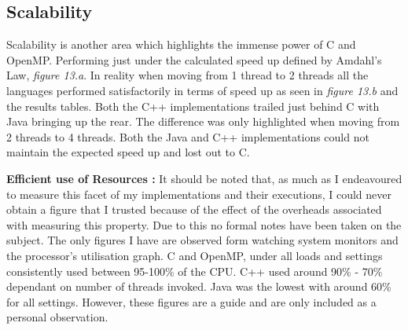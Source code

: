\documentclass[11pt]{article} %
\begin{document}
\subsection{Scalability}
Scalability is another area which highlights the immense power of C and OpenMP. Performing just under the calculated speed up defined by Amdahl's Law, {\it figure 13.a}. In reality when moving from 1 thread to 2 threads all the languages performed satisfactorily in terms of speed up as seen in {\it figure 13.b} and the results tables. Both the C++ implementations trailed just behind C with Java bringing up the rear. The difference was only highlighted when moving from 2 threads to 4 threads. Both the Java and C++ implementations could not maintain the expected speed up and lost out to C. 
\bigskip
\begin{mdframed}
{\bf Efficient use of Resources :} It should be noted that, as much as I endeavoured to measure this facet of my implementations and their executions, I could never obtain a figure that I trusted because of the effect of the overheads associated with measuring this property. Due to this no formal notes have been taken on the subject. The only figures I have are observed form watching system monitors and the processor's utilisation graph. C and OpenMP, under all loads and settings consistently used between 95-100\% of the CPU. C++ used around 90\% - 70\% dependant on number of threads invoked. Java was the lowest with around 60\% for all settings. However, these figures are a guide and are only included as a personal observation.
\end{mdframed}
\end{document}
